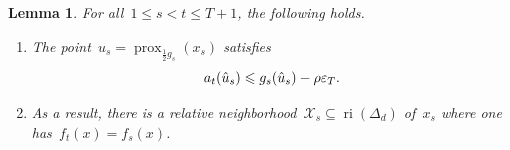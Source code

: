 \documentclass[11pt]{article}
\numberwithin{equation}{section}
\let\le\leqslant
\newtheorem{lemma}[theorem]{Lemma}
\theoremstyle{remark}
\newcommand{\veps}{\varepsilon}
\newcommand{\ri}{\operatorname{ri}}
\newcommand{\Simp}{\Delta_d}
\newcommand{\prox}{\operatorname{prox}}
\newcommand{\1}{\mathbf{1}}
\newcommand{\half}{\frac{1}{2}}
\begin{document}
\begin{lemma}
\label{lem:local-invisibility}
For all~$1\le s<t\le T+1$, the following holds.
\vspace{-0.1cm}
\begin{enumerate}
\item 
The point~$\hat u_s = \prox_{\half g_s}(x_s)$ satisfies\vspace{-0.2cm}
\begin{equation}
\label{eq:margin}
         a_t(\hat u_s) \le g_s(\hat u_s) - \rho\veps_T. \vspace{-0.1cm}
\end{equation}
\item As a result, there is a relative neighborhood~$\mathcal{X}_s \subseteq\ri(\Simp)$ of~$x_s$ where one has~$f_t(x) = f_s(x)$.
\end{enumerate}
\end{lemma}
\end{document}
